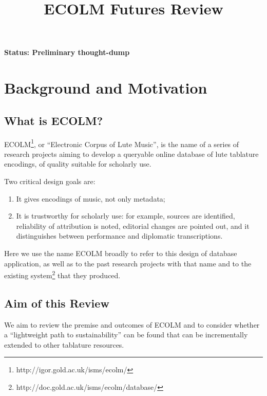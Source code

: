 \documentclass[twocolumn,10pt]{paper}
\begin{document}
\title{ECOLM Futures Review}

\maketitle
\begin{sloppypar}
  
  
  {\bf Status: Preliminary thought-dump}
  
  \section{Background and Motivation}

  \subsection{What is ECOLM?}

  ECOLM\footnote{http://igor.gold.ac.uk/isms/ecolm/}, or ``Electronic
  Corpus of Lute Music'', is the name of a series of research projects
  aiming to develop a queryable online database of lute tablature
  encodings, of quality suitable for scholarly use.

  Two critical design goals are:
  
  \begin{enumerate}
  \item It gives encodings of music, not only metadata;
  \item It is trustworthy for scholarly use: for example, sources are
    identified, reliability of attribution is noted, editorial changes
    are pointed out, and it distinguishes between performance and
    diplomatic transcriptions.
  \end{enumerate}
  
  Here we use the name ECOLM broadly to refer to this design of
  database application, as well as to the past research projects with
  that name and to the existing
  system\footnote{http://doc.gold.ac.uk/isms/ecolm/database/} that
  they produced.

  \subsection{Aim of this Review}

  We aim to review the premise and outcomes of ECOLM and to consider
  whether a ``lightweight path to sustainability'' can be found that
  can be incrementally extended to other tablature resources.


\end{sloppypar}
\end{document}
